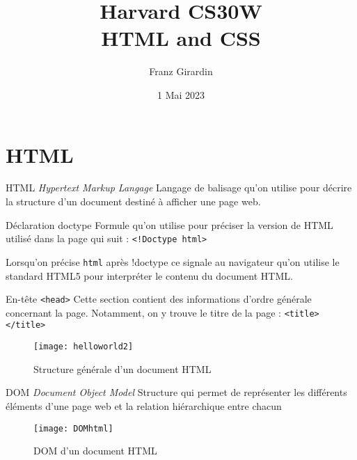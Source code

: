 \documentclass{report}
\title{\Huge{Harvard CS30W}\\HTML and CSS}
\author{\huge{Franz Girardin}}
\date{1 Mai 2023}
\begin{document}
\maketitle

\newpage
{}
\tableofcontents
\pagebreak
% 
\chapter{HTML}
\begin{DefG}{HTML \textit{Hypertext Markup Langage}}{}
Langage de balisage qu'on utilise pour décrire la structure d'un document
destiné à afficher une page web.
\end{DefG}


\begin{DefG}{Déclaration doctype}{}
Formule qu'on utilise pour préciser la version de HTML utilisé dans la page qui suit : \texttt{\footnotesize{<!Doctype html>}}
\end{DefG}


\begin{Remarque*}{}{}
Lorsqu'on précise \texttt{\footnotesize{html}} après !doctype ce signale au navigateur qu'on utilise le 
standard HTML5 pour interpréter le contenu du document HTML. 
\end{Remarque*}


\begin{Syntaxe*}{En-tête \texttt{<head>}}{}
Cette section contient des informations d'ordre générale concernant la page. Notamment, on y trouve le titre de la page : \texttt{\footnotesize{<title> </title>}} 
\end{Syntaxe*}


\begin{figure}[H]
	\centering
	\caption{Structure générale d'un document HTML}
	\texttt{[image: helloworld2]} 
\end{figure} 



\begin{DefG}{DOM \textit{Document Object Model}}{}
Structure qui permet de représenter les différents éléments d'une page web et la relation hiérarchique entre
chacun 
\end{DefG}



\begin{figure}[H]
	\centering
	\caption{DOM d'un document HTML}
	\texttt{[image: DOMhtml]} 
\end{figure}
\end{document}
